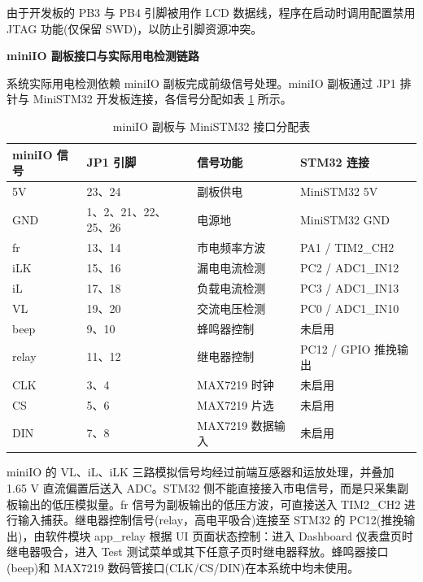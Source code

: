 \documentclass[UTF8,a4paper,zihao=-4,fontset=macnew]{ctexart}
\begin{document}
由于开发板的 PB3 与 PB4 引脚被用作 LCD 数据线，程序在启动时调用配置禁用 JTAG 功能(仅保留 SWD)，以防止引脚资源冲突。

\textbf{miniIO 副板接口与实际用电检测链路}

系统实际用电检测依赖 miniIO 副板完成前级信号处理。miniIO 副板通过 JP1 排针与 MiniSTM32 开发板连接，各信号分配如表 \ref{tab:miniio-iface} 所示。

\begin{table}[H]
\centering
{}
\caption{miniIO 副板与 MiniSTM32 接口分配表}
\label{tab:miniio-iface}
\begin{tabular}{llll}
\toprule
miniIO 信号 & JP1 引脚 & 信号功能 & STM32 连接 \\
\midrule
5V  & 23、24 & 副板供电 & MiniSTM32 5V \\
GND & 1、2、21、22、25、26 & 电源地 & MiniSTM32 GND \\
fr  & 13、14 & 市电频率方波 & PA1 / TIM2\_CH2 \\
iLK & 15、16 & 漏电电流检测 & PC2 / ADC1\_IN12 \\
iL  & 17、18 & 负载电流检测 & PC3 / ADC1\_IN13 \\
VL  & 19、20 & 交流电压检测 & PC0 / ADC1\_IN10 \\
beep & 9、10 & 蜂鸣器控制 & 未启用 \\
relay & 11、12 & 继电器控制 & PC12 / GPIO 推挽输出 \\
CLK & 3、4 & MAX7219 时钟 & 未启用 \\
CS  & 5、6 & MAX7219 片选 & 未启用 \\
DIN & 7、8 & MAX7219 数据输入 & 未启用 \\
\bottomrule
\end{tabular}
\end{table}

miniIO 的 VL、iL、iLK 三路模拟信号均经过前端互感器和运放处理，并叠加 1.65 V 直流偏置后送入 ADC。STM32 侧不能直接接入市电信号，而是只采集副板输出的低压模拟量。fr 信号为副板输出的低压方波，可直接送入 TIM2\_CH2 进行输入捕获。继电器控制信号(relay，高电平吸合)连接至 STM32 的 PC12(推挽输出)，由软件模块 app\_relay 根据 UI 页面状态控制：进入 Dashboard 仪表盘页时继电器吸合，进入 Test 测试菜单或其下任意子页时继电器释放。蜂鸣器接口(beep)和 MAX7219 数码管接口(CLK/CS/DIN)在本系统中均未使用。
\end{document}
